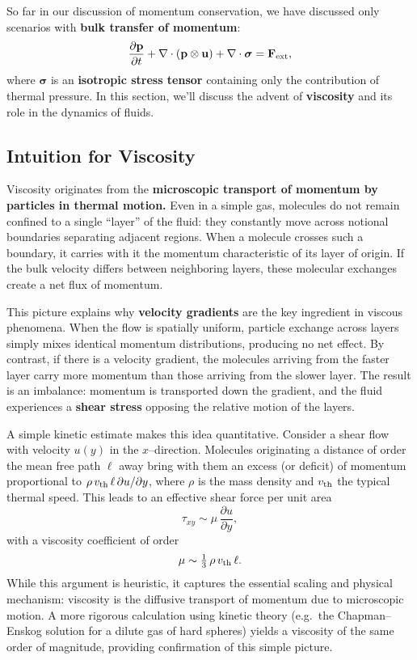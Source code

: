 So far in our discussion of momentum conservation, we have discussed only scenarios with \textbf{bulk transfer of momentum}:
\[
\frac{\partial {\bf p}}{\partial t} + \nabla \cdot ({\bf p} \otimes {\bf u}) + \nabla \cdot \boldsymbol{\sigma} = {\bf F}_{\rm ext},
\]
where $\boldsymbol{\sigma}$ is an \textbf{isotropic stress tensor} containing only the contribution of thermal pressure. In this section, we'll discuss the advent of \textbf{viscosity} and its role in the dynamics of fluids.
\par
\subsection{Intuition for Viscosity}

Viscosity originates from the \textbf{microscopic transport of momentum by
particles in thermal motion.} Even in a simple gas, molecules do not
remain confined to a single ``layer'' of the fluid: they constantly
move across notional boundaries separating adjacent regions. When a
molecule crosses such a boundary, it carries with it the momentum
characteristic of its layer of origin. If the bulk velocity differs
between neighboring layers, these molecular exchanges create a net
flux of momentum.

This picture explains why \textbf{velocity gradients} are the key
ingredient in viscous phenomena. When the flow is spatially uniform,
particle exchange across layers simply mixes identical momentum
distributions, producing no net effect. By contrast, if there is a
velocity gradient, the molecules arriving from the faster layer carry
more momentum than those arriving from the slower layer. The result is
an imbalance: momentum is transported down the gradient, and the fluid
experiences a \textbf{shear stress} opposing the relative motion of
the layers.

A simple kinetic estimate makes this idea quantitative. Consider a
shear flow with velocity $u(y)$ in the $x$--direction. Molecules
originating a distance of order the mean free path $\ell$ away bring
with them an excess (or deficit) of momentum proportional to
$\rho\,v_{\rm th}\,\ell\,\partial u/\partial y$, where $\rho$ is the
mass density and $v_{\rm th}$ the typical thermal speed. This leads to
an effective shear force per unit area
\[
\tau_{xy} \sim \mu \, \frac{\partial u}{\partial y},
\]
with a viscosity coefficient of order
\[
\mu \sim \tfrac{1}{3}\,\rho\,v_{\rm th}\,\ell.
\]
While this argument is heuristic, it captures the essential scaling
and physical mechanism: viscosity is the diffusive transport of
momentum due to microscopic motion. A more rigorous calculation using
kinetic theory (e.g.\ the Chapman--Enskog solution for a dilute gas of
hard spheres) yields a viscosity of the same order of magnitude,
providing confirmation of this simple picture.

